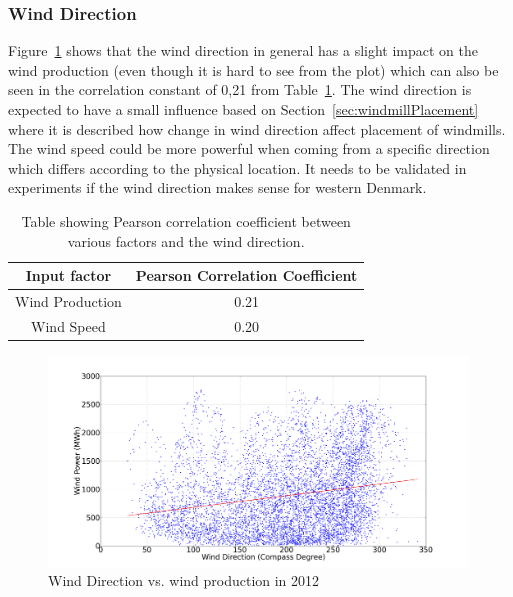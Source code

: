 \subsubsection{Wind Direction}
Figure~\ref{fig:windDirVsProd} shows that the wind direction in general has a slight impact on the wind production (even though it is hard to see from the plot) which can also be seen in the correlation constant of 0,21 from Table~\ref{table:pearsonCoeficientWindDirection}. The wind direction is expected to have a small influence based on Section~\ref{sec:windmillPlacement} where it is described how change in wind direction affect placement of windmills. The wind speed could be more powerful when coming from a specific direction which differs according to the physical location. It needs to be validated in experiments if the wind direction makes sense for western Denmark.
 
\begin{table}[H]
\centering  %
\begin{tabular}{|c|c|} %
\hline
Input factor & Pearson Correlation Coefficient \\ %
\hline                  %
Wind Production & 0.21 \\ \hline %
Wind Speed & 0.20 \\ \hline %
\hline %
\end{tabular}
\caption{Table showing Pearson correlation coefficient between various factors and the wind direction.} %
\label{table:pearsonCoeficientWindDirection} %
\end{table}

\begin{figure}[H]
\centering
\includegraphics[width=0.99\textwidth]{billeder/productionVsWindDirection.png}
\caption{Wind Direction vs. wind production in 2012}
\label{fig:windDirVsProd}
\end{figure}

